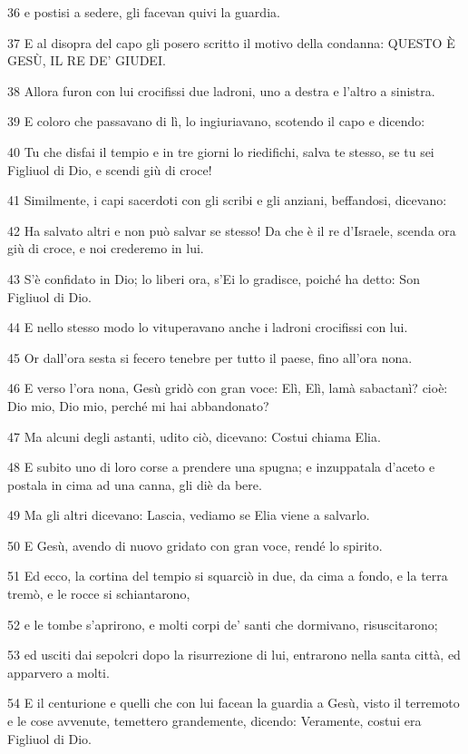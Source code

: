 \par 36 e postisi a sedere, gli facevan quivi la guardia.
\par 37 E al disopra del capo gli posero scritto il motivo della condanna: QUESTO È GESÙ, IL RE DE' GIUDEI.
\par 38 Allora furon con lui crocifissi due ladroni, uno a destra e l'altro a sinistra.
\par 39 E coloro che passavano di lì, lo ingiuriavano, scotendo il capo e dicendo:
\par 40 Tu che disfai il tempio e in tre giorni lo riedifichi, salva te stesso, se tu sei Figliuol di Dio, e scendi giù di croce!
\par 41 Similmente, i capi sacerdoti con gli scribi e gli anziani, beffandosi, dicevano:
\par 42 Ha salvato altri e non può salvar se stesso! Da che è il re d'Israele, scenda ora giù di croce, e noi crederemo in lui.
\par 43 S'è confidato in Dio; lo liberi ora, s'Ei lo gradisce, poiché ha detto: Son Figliuol di Dio.
\par 44 E nello stesso modo lo vituperavano anche i ladroni crocifissi con lui.
\par 45 Or dall'ora sesta si fecero tenebre per tutto il paese, fino all'ora nona.
\par 46 E verso l'ora nona, Gesù gridò con gran voce: Elì, Elì, lamà sabactanì? cioè: Dio mio, Dio mio, perché mi hai abbandonato?
\par 47 Ma alcuni degli astanti, udito ciò, dicevano: Costui chiama Elia.
\par 48 E subito uno di loro corse a prendere una spugna; e inzuppatala d'aceto e postala in cima ad una canna, gli diè da bere.
\par 49 Ma gli altri dicevano: Lascia, vediamo se Elia viene a salvarlo.
\par 50 E Gesù, avendo di nuovo gridato con gran voce, rendé lo spirito.
\par 51 Ed ecco, la cortina del tempio si squarciò in due, da cima a fondo, e la terra tremò, e le rocce si schiantarono,
\par 52 e le tombe s'aprirono, e molti corpi de' santi che dormivano, risuscitarono;
\par 53 ed usciti dai sepolcri dopo la risurrezione di lui, entrarono nella santa città, ed apparvero a molti.
\par 54 E il centurione e quelli che con lui facean la guardia a Gesù, visto il terremoto e le cose avvenute, temettero grandemente, dicendo: Veramente, costui era Figliuol di Dio.

